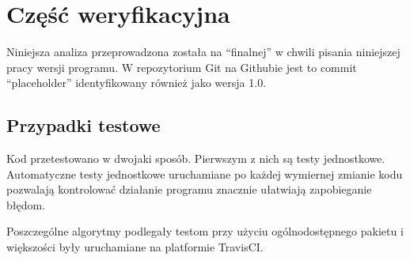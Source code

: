 \section[Weryfikacja]{Część weryfikacyjna} %
    Niniejsza analiza przeprowadzona została na ``finalnej'' w chwili pisania niniejszej pracy wersji programu.
    W repozytorium Git na Githubie jest to commit ``placeholder'' 
    identyfikowany również jako wersja 1.0.

    \subsection{Przypadki testowe}

    Kod przetestowano w dwojaki sposób. Pierwszym z nich są testy jednostkowe.
    Automatyczne testy jednostkowe uruchamiane po każdej wymiernej zmianie kodu
    pozwalają kontrolować działanie programu znacznie ułatwiają zapobieganie
    błędom.

    Poszczególne algorytmy podlegały testom przy użyciu ogólnodostępnego
    pakietu   i większości były
    uruchamiane na platformie TravisCI.

